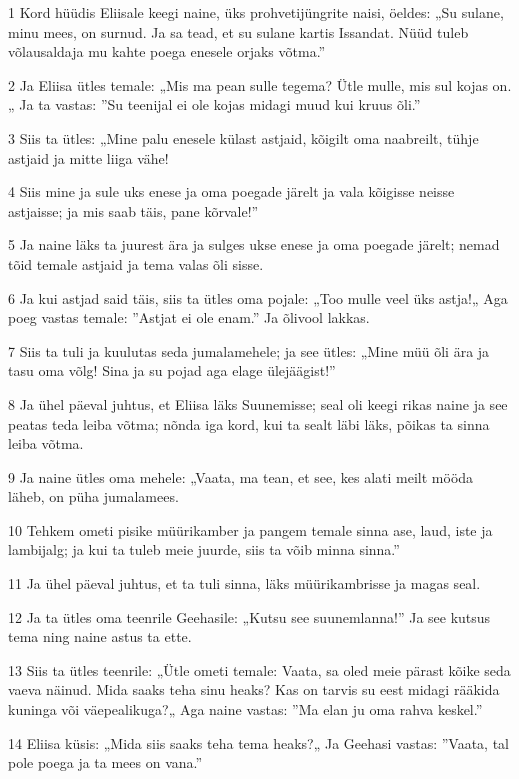 \par 1 Kord hüüdis Eliisale keegi naine, üks prohvetijüngrite naisi, öeldes: „Su sulane, minu mees, on surnud. Ja sa tead, et su sulane kartis Issandat. Nüüd tuleb võlausaldaja mu kahte poega enesele orjaks võtma.”
\par 2 Ja Eliisa ütles temale: „Mis ma pean sulle tegema? Ütle mulle, mis sul kojas on.„ Ja ta vastas: ”Su teenijal ei ole kojas midagi muud kui kruus õli.”
\par 3 Siis ta ütles: „Mine palu enesele külast astjaid, kõigilt oma naabreilt, tühje astjaid ja mitte liiga vähe!
\par 4 Siis mine ja sule uks enese ja oma poegade järelt ja vala kõigisse neisse astjaisse; ja mis saab täis, pane kõrvale!”
\par 5 Ja naine läks ta juurest ära ja sulges ukse enese ja oma poegade järelt; nemad tõid temale astjaid ja tema valas õli sisse.
\par 6 Ja kui astjad said täis, siis ta ütles oma pojale: „Too mulle veel üks astja!„ Aga poeg vastas temale: ”Astjat ei ole enam.” Ja õlivool lakkas.
\par 7 Siis ta tuli ja kuulutas seda jumalamehele; ja see ütles: „Mine müü õli ära ja tasu oma võlg! Sina ja su pojad aga elage ülejäägist!”
\par 8 Ja ühel päeval juhtus, et Eliisa läks Suunemisse; seal oli keegi rikas naine ja see peatas teda leiba võtma; nõnda iga kord, kui ta sealt läbi läks, põikas ta sinna leiba võtma.
\par 9 Ja naine ütles oma mehele: „Vaata, ma tean, et see, kes alati meilt mööda läheb, on püha jumalamees.
\par 10 Tehkem ometi pisike müürikamber ja pangem temale sinna ase, laud, iste ja lambijalg; ja kui ta tuleb meie juurde, siis ta võib minna sinna.”
\par 11 Ja ühel päeval juhtus, et ta tuli sinna, läks müürikambrisse ja magas seal.
\par 12 Ja ta ütles oma teenrile Geehasile: „Kutsu see suunemlanna!” Ja see kutsus tema ning naine astus ta ette.
\par 13 Siis ta ütles teenrile: „Ütle ometi temale: Vaata, sa oled meie pärast kõike seda vaeva näinud. Mida saaks teha sinu heaks? Kas on tarvis su eest midagi rääkida kuninga või väepealikuga?„ Aga naine vastas: ”Ma elan ju oma rahva keskel.”
\par 14 Eliisa küsis: „Mida siis saaks teha tema heaks?„ Ja Geehasi vastas: ”Vaata, tal pole poega ja ta mees on vana.”
